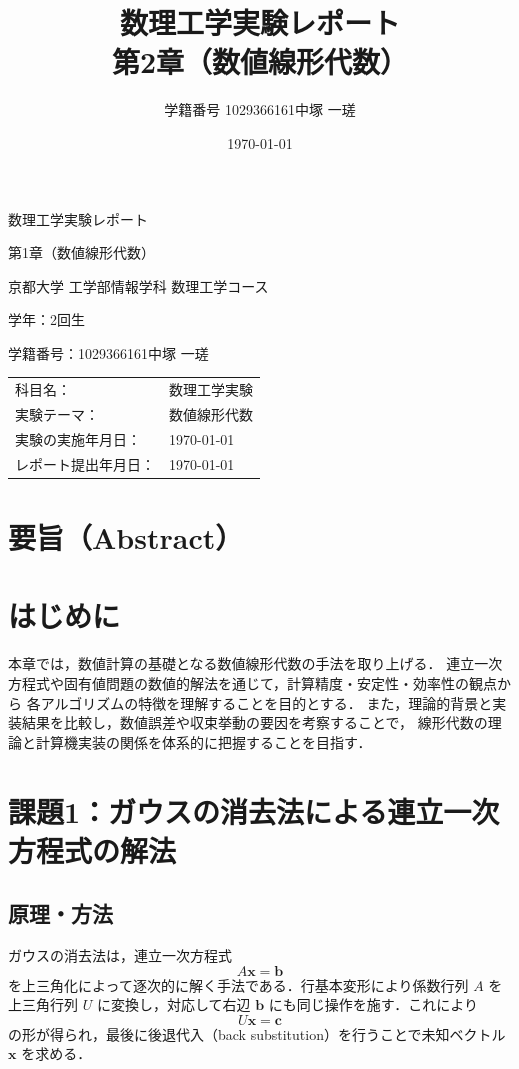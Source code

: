 \documentclass[a4paper,11pt]{ltjsarticle}
\title{数理工学実験レポート\\\vspace{5pt}\large 第2章（数値線形代数）}
\author{学籍番号 1029366161\quad 中塚 一瑳}
\date{\today}
\begin{document}
\begin{titlepage}
\centering
{\Large 数理工学実験レポート\par}
\vspace{4mm}
{\large 第1章（数値線形代数）\par}
\vspace{15mm}
{\large 京都大学 工学部情報学科 数理工学コース\par}
{\large 学年：2回生\par}
{\large 学籍番号：1029366161\quad 中塚 一瑳\par}
\vspace{10mm}
\begin{tabular}{@{}ll}
科目名： & 数理工学実験 \\
実験テーマ： & 数値線形代数 \\
実験の実施年月日： & \today \\
レポート提出年月日： & \today \\
\end{tabular}
\vfill
\end{titlepage}

\section*{要旨（Abstract）}


\section{はじめに}
本章では，数値計算の基礎となる数値線形代数の手法を取り上げる．
連立一次方程式や固有値問題の数値的解法を通じて，計算精度・安定性・効率性の観点から
各アルゴリズムの特徴を理解することを目的とする．
また，理論的背景と実装結果を比較し，数値誤差や収束挙動の要因を考察することで，
線形代数の理論と計算機実装の関係を体系的に把握することを目指す．


\section{課題1：ガウスの消去法による連立一次方程式の解法}

\subsection{原理・方法}
ガウスの消去法は，連立一次方程式
\[
A\boldsymbol{x} = \boldsymbol{b}
\]
を上三角化によって逐次的に解く手法である\cite{exp2025}．行基本変形により係数行列 $A$ を上三角行列 $U$ に変換し，対応して右辺 $\boldsymbol{b}$ にも同じ操作を施す．これにより
\[
U\boldsymbol{x} = \boldsymbol{c}
\]
の形が得られ，最後に後退代入（back substitution）を行うことで未知ベクトル $\boldsymbol{x}$ を求める．
\end{document}
